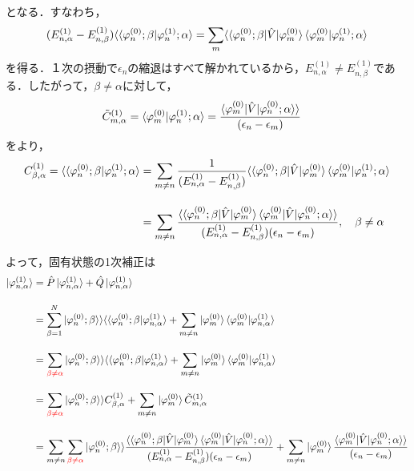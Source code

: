 となる．すなわち，
\begin{equation}
    (E^{(1)}_{n,\alpha}-E^{(1)}_{n,\beta})\langle\braket{\varphi^{(0)}_{n};\beta|\varphi^{(1)}_n;\alpha}
    =\sum_{m}\langle\braket{\varphi^{(0)}_{n};\beta|\hat{V}|\varphi^{(0)}_m}
    \braket{\varphi^{(0)}_{m}|\varphi^{(1)}_n;\alpha}
\end{equation}
を得る．１次の摂動で$\epsilon_n$の縮退はすべて解かれているから，$E^{(1)}_{n,\alpha}\neq E^{(1)}_{n,\beta}$である．したがって，$\beta\neq\alpha$に対して，
\begin{align}
    \Tilde{C}^{(1)}_{m,\alpha}=\braket{\varphi^{(0)}_{m}|\varphi^{(1)}_n;\alpha}
    &=\frac{\braket{\varphi^{(0)}_{m}|\hat{V}|\varphi^{(0)}_n;\alpha}\rangle}{(\epsilon_n-\epsilon_m)}
\end{align}
をより，
\begin{align}
    C^{(1)}_{\beta,\alpha}=\langle\braket{\varphi^{(0)}_{n};\beta|\varphi^{(1)}_n;\alpha}
    &=\sum_{m\neq n}\frac{1}{(E^{(1)}_{n,\alpha}-E^{(1)}_{n,\beta})}
    \langle\braket{\varphi^{(0)}_{n};\beta|\hat{V}|\varphi^{(0)}_m}
    \braket{\varphi^{(0)}_{m}|\varphi^{(1)}_n;\alpha}\nn[10pt]
    &=\sum_{m\neq n}
    \frac{\langle\braket{\varphi^{(0)}_{n};\beta|\hat{V}|\varphi^{(0)}_m}
    \braket{\varphi^{(0)}_{m}|\hat{V}|\varphi^{(0)}_n;\alpha}\rangle}
    {(E^{(1)}_{n,\alpha}-E^{(1)}_{n,\beta})(\epsilon_n-\epsilon_m)},\ \ \ \beta\neq\alpha
\end{align}

よって，固有状態の1次補正は
\begin{align}
    \ket{\varphi_{n,\alpha}^{(1)}}
    &=\hat{P}\ket{\varphi_{n,\alpha}^{(1)}}+\hat{Q}\ket{\varphi_{n,\alpha}^{(1)}}\nn[10pt]
    &=\sum_{\beta=1}^{N}|\varphi^{(0)}_n;\beta\rangle\rangle
    \langle\langle\varphi^{(0)}_n;\beta|\varphi_{n,\alpha}^{(1)}\rangle
    +\sum_{m\neq n}\ket{\varphi^{(0)}_m}\braket{\varphi^{(0)}_m|\varphi_{n,\alpha}^{(1)}}\nn[10pt]
    &=\sum_{\textcolor{red}{\beta\neq\alpha}}|\varphi^{(0)}_n;\beta\rangle\rangle
    \langle\langle\varphi^{(0)}_n;\beta|\varphi_{n,\alpha}^{(1)}\rangle
    +\sum_{m\neq n}\ket{\varphi^{(0)}_m}\braket{\varphi^{(0)}_m|\varphi_{n,\alpha}^{(1)}}\nn[10pt]
    &=\sum_{\textcolor{red}{\beta\neq\alpha}}|\varphi^{(0)}_n;\beta\rangle\rangle
    C^{(1)}_{\beta,\alpha}
    +\sum_{m\neq n}\ket{\varphi^{(0)}_m}\Tilde{C}^{(1)}_{m,\alpha}\nn[10pt]
    &=\sum_{m\neq n}\sum_{\textcolor{red}{\beta\neq\alpha}}|\varphi^{(0)}_n;\beta\rangle\rangle
    \frac{\langle\braket{\varphi^{(0)}_{n};\beta|\hat{V}|\varphi^{(0)}_m}
    \braket{\varphi^{(0)}_{m}|\hat{V}|\varphi^{(0)}_n;\alpha}\rangle}
    {(E^{(1)}_{n,\alpha}-E^{(1)}_{n,\beta})(\epsilon_n-\epsilon_m)}
    +\sum_{m\neq n}\ket{\varphi^{(0)}_m}
    \frac{\braket{\varphi^{(0)}_{m}|\hat{V}|\varphi^{(0)}_n;\alpha}\rangle}{(\epsilon_n-\epsilon_m)}
\end{align}

